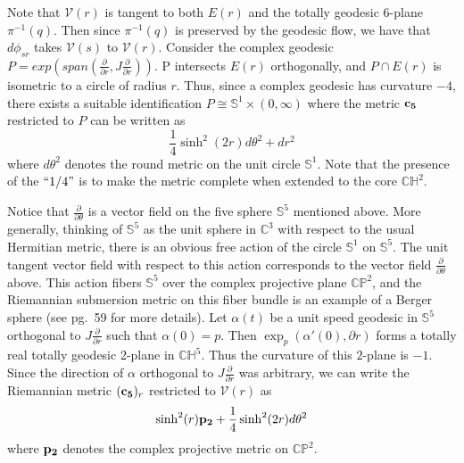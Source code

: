 \documentclass[10pt]{amsart}
\def\V{\mathcal{V}}
\def\S{\mathcal{S}}
\def\a{\alpha}
\def\ddt{\frac{\partial}{\partial \theta}}
\def\ddr{\frac{\partial}{\partial r}}
\def\th{\theta}
\def\H{\mathbb{H}}
\def\C{\mathbb{C}}
\def\S{\mathbb{S}}
\def\P{\mathbb{P}}
\theoremstyle{definition}
\theoremstyle{remark}
\numberwithin{equation}{section}
\begin{document}
Note that $\V(r)$ is tangent to both $E(r)$ and the totally geodesic $6$-plane $\pi^{-1}(q)$.  
Then since $\pi^{-1}(q)$ is preserved by the geodesic flow, we have that $d \phi_{sr}$ takes $\V(s)$ to $\V(r)$.  
Consider the complex geodesic $P = exp(span(\ddr, J \ddr))$. 
P intersects $E(r)$ orthogonally, and $P \cap E(r)$ is isometric to a circle of radius $r$.  
Thus, since a complex geodesic has curvature $-4$, there exists a suitable identification $P \cong \S^1 \times (0,\infty)$ where the metric ${\bf c_5}$ restricted to $P$ can be written as
	\begin{equation*}
	\frac{1}{4} \sinh^2(2r) d \th^2 + dr^2
	\end{equation*}
where $d \th^2$ denotes the round metric on the unit circle $\S^1$.  
Note that the presence of the $``1/4"$ is to make the metric complete when extended to the core $\C \H^2$.

Notice that $\ddt$ is a vector field on the five sphere $\S^5$ mentioned above.  
More generally, thinking of $\S^5$ as the unit sphere in $\C^3$ with respect to the usual Hermitian metric, there is an obvious free action of the circle $\S^1$ on $\S^5$.  
The unit tangent vector field with respect to this action corresponds to the vector field $\ddt$ above.
This action fibers $\S^5$ over the complex projective plane $\C \P^2$, and the Riemannian submersion metric on this fiber bundle is an example of a Berger sphere (see \cite{Farrell Jones} pg.\ 59 for more details).  
Let $\a(t)$ be a unit speed geodesic in $\S^5$ orthogonal to $J \ddr$ such that $\a(0) = p$.
Then $\exp_p(\a'(0), \partial r)$ forms a totally real totally geodesic 2-plane in $\C \H^5$.  
Thus the curvature of this $2$-plane is $-1$.  
Since the direction of $\a$ orthogonal to $J \ddr$ was arbitrary, we can write the Riemannian metric $({\bf c_5})_r$ restricted to $\mathcal{V}(r)$ as
	\begin{equation*}
	\sinh^2(r) {\bf p_2} + \frac{1}{4} \sinh^2(2r) d \th^2
	\end{equation*}
where ${\bf p_2}$ denotes the complex projective metric on $\C \P^2$.  
\end{document}
